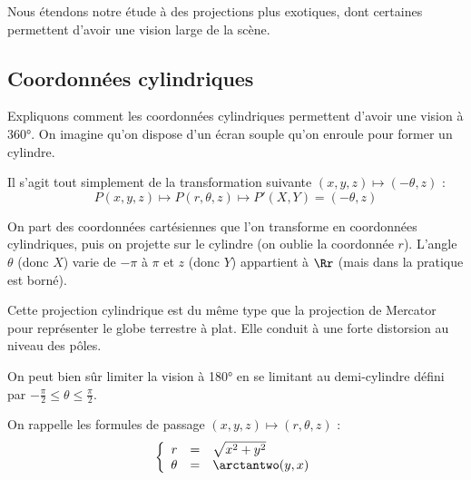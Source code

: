 \documentclass[11pt,class=report,crop=false]{standalone}
\begin{document}
Nous étendons notre étude à des projections plus exotiques, dont certaines permettent d'avoir une vision large de la scène.

\subsection{Coordonnées cylindriques}


Expliquons comment les coordonnées cylindriques permettent d'avoir une vision à \ang{360}. On imagine qu'on dispose d'un écran souple qu'on enroule pour former un cylindre.

Il s'agit tout simplement de la transformation suivante $(x,y,z) \mapsto (-\theta,z)$ :
$$P(x,y,z) \longmapsto P(r,\theta,z) \longmapsto P'(X,Y) = (-\theta,z)$$

On part des coordonnées cartésiennes que l'on transforme en coordonnées cylindriques, puis on projette sur le cylindre (on oublie la coordonnée $r$).
L'angle $\theta$ (donc $X$) varie de $-\pi$ à $\pi$ et $z$ (donc $Y$) appartient à $\Rr$ (mais dans la pratique est borné).

\begin{center}
\begin{minipage}{0.49\textwidth}	
\end{minipage}
\begin{minipage}{0.45\textwidth}	
\end{minipage}
\end{center}

Cette projection cylindrique est du même type que la projection de Mercator pour représenter le globe terrestre à plat. Elle conduit à une forte distorsion au niveau des pôles.



On peut bien sûr limiter la vision à \ang{180} en se limitant au demi-cylindre défini par $-\frac\pi2 \le \theta \le \frac\pi2$.

On rappelle les formules de passage $(x,y,z) \mapsto (r,\theta,z)$ :
$$\left\{\begin{array}{rcl}
r &=& \sqrt{x^2+y^2} \\
\theta &=&  \arctantwo(y,x) 
\end{array}\right.$$
\end{document}
